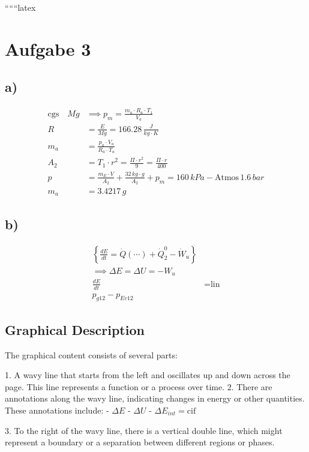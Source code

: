 
``````latex


\section*{Aufgabe 3}

\subsection*{a)}

\begin{align*}
\text{cgs} \quad Mg & \implies p_m = \frac{m_a \cdot R_a \cdot T_1}{V_a} \\
R &= \frac{E}{Mg} = 166.28 \, \frac{J}{kg \cdot K} \\
m_a &= \frac{p_a \cdot V_a}{R_a \cdot T_a} \\
A_2 &= T_1 \cdot r^2 = \frac{\Pi \cdot r^2}{9} = \frac{\Pi \cdot r}{400} \\
p &= \frac{m_E \cdot V}{A_2} + \frac{32 \, kg \cdot g}{A_2} + p_m = 160 \, kPa - \text{Atmos} \, 1.6 \, bar \\
m_a &= 3.4217 \, g
\end{align*}

\subsection*{b)}

\begin{align*}
\left\{ \frac{dE}{dt} = \dot{Q}(\cdots) + \dot{Q}_2^0 - \dot{W}_u \right\} \\
\implies \Delta E = \Delta U = -W_u \\
\frac{dE}{dt} &= \text{lin} \\
p_{g12} - p_{Ev12}
\end{align*}

\subsection*{Graphical Description}

The graphical content consists of several parts:

1. A wavy line that starts from the left and oscillates up and down across the page. This line represents a function or a process over time.
2. There are annotations along the wavy line, indicating changes in energy or other quantities. These annotations include:
   - $\Delta E$
   - $\Delta U$
   - $\Delta E_{int} = \text{cif}$

3. To the right of the wavy line, there is a vertical double line, which might represent a boundary or a separation between different regions or phases.

